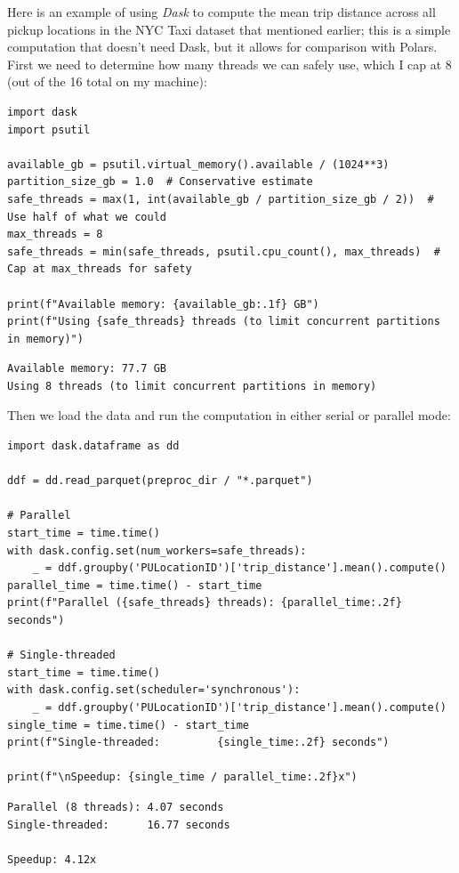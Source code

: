Here is an example of using \textit{Dask} to compute the mean trip distance across all pickup locations in the NYC Taxi dataset that mentioned earlier; this is a simple computation that doesn't need Dask, but it allows for comparison with Polars.  First we need to determine how many threads we can safely use, which I cap at 8 (out of the 16 total on my machine):

\begin{lstlisting}[style=Python]
import dask
import psutil

available_gb = psutil.virtual_memory().available / (1024**3)
partition_size_gb = 1.0  # Conservative estimate
safe_threads = max(1, int(available_gb / partition_size_gb / 2))  # Use half of what we could
max_threads = 8
safe_threads = min(safe_threads, psutil.cpu_count(), max_threads)  # Cap at max_threads for safety

print(f"Available memory: {available_gb:.1f} GB")
print(f"Using {safe_threads} threads (to limit concurrent partitions in memory)")
\end{lstlisting}

\begin{lstlisting}[style=shellshort]
Available memory: 77.7 GB
Using 8 threads (to limit concurrent partitions in memory)
\end{lstlisting}

Then we load the data and run the computation in either serial or parallel mode:

\begin{lstlisting}[style=Python]
import dask.dataframe as dd

ddf = dd.read_parquet(preproc_dir / "*.parquet")

# Parallel
start_time = time.time()
with dask.config.set(num_workers=safe_threads):
    _ = ddf.groupby('PULocationID')['trip_distance'].mean().compute()
parallel_time = time.time() - start_time
print(f"Parallel ({safe_threads} threads): {parallel_time:.2f} seconds")

# Single-threaded
start_time = time.time()
with dask.config.set(scheduler='synchronous'):
    _ = ddf.groupby('PULocationID')['trip_distance'].mean().compute()
single_time = time.time() - start_time
print(f"Single-threaded:         {single_time:.2f} seconds")

print(f"\nSpeedup: {single_time / parallel_time:.2f}x")
\end{lstlisting}

\begin{lstlisting}[style=shellshort]
Parallel (8 threads): 4.07 seconds
Single-threaded:      16.77 seconds

Speedup: 4.12x
\end{lstlisting}

